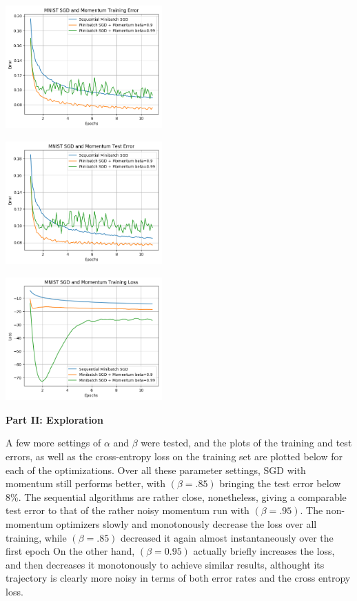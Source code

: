 \documentclass[10pt]{article}
\begin{document}
\begin{multicols}{2}
\begin{center}
\end{center}
\begin{center}
    \includegraphics[width=0.45\textwidth]{SGDandMomentumTrainingError.png}
\end{center}
\begin{center}
    \includegraphics[width=0.45\textwidth]{SGDandMomentumTestError.png}
\end{center}
\begin{center}
    \includegraphics[width=0.45\textwidth]{SGDandMomentumTrainingLoss.png}
\end{center}
\noindent
\textbf{Part II: Exploration} \par
A few more settings of $\alpha$ and $\beta$ were tested, and the plots of the training and test errors, as well as the cross-entropy loss on the training set are plotted below for each of the optimizations. Over all these parameter settings, SGD with momentum still performs better, with $(\beta=.85)$ bringing the test error below 8\%. The sequential algorithms are rather close, nonetheless, giving a comparable test error to that of the rather noisy momentum run with $(\beta=.95)$. The non-momentum optimizers slowly and monotonously decrease the loss over all training, while $(\beta=.85)$ decreased it again almost instantaneously over the first epoch On the other hand, $(\beta=0.95)$ actually briefly increases the loss, and then decreases it monotonously to achieve similar results, althought its trajectory is clearly more noisy in terms of both error rates and the cross entropy loss. \par

\end{multicols}
\end{document}
